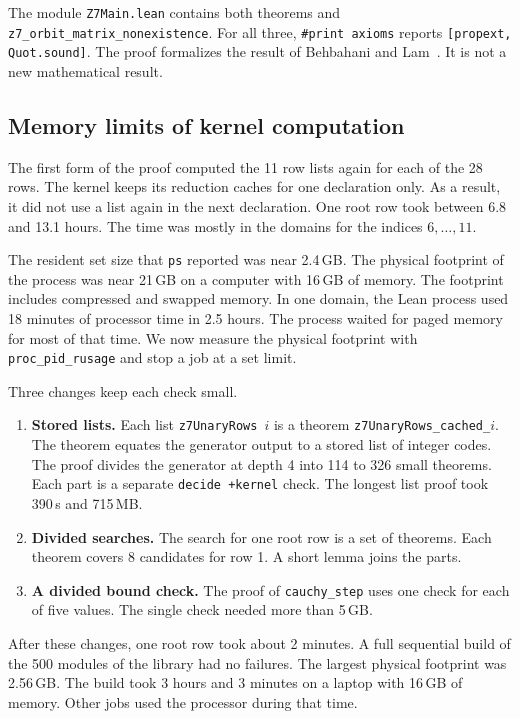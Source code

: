 \documentclass[pdflatex,sn-mathphys-num]{sn-jnl}
\theoremstyle{thmstyleone}
\theoremstyle{thmstyletwo}
\theoremstyle{thmstylethree}
\numberwithin{equation}{section}
\begin{document}
The module \texttt{Z7Main.lean} contains both theorems and \texttt{z7\_orbit\_matrix\_nonexistence}. For all three, \texttt{\#print axioms} reports \texttt{[propext, Quot.sound]}. The proof formalizes the result of Behbahani and Lam~\cite{behbahani2011strongly}. It is not a new mathematical result.

\subsection{Memory limits of kernel computation}
\label{sec:resources}

The first form of the proof computed the 11 row lists again for each of the 28 rows. The kernel keeps its reduction caches for one declaration only. As a result, it did not use a list again in the next declaration. One root row took between 6.8 and 13.1 hours. The time was mostly in the domains for the indices $6, \dots, 11$.

The resident set size that \texttt{ps} reported was near 2.4\,GB. The physical footprint of the process was near 21\,GB on a computer with 16\,GB of memory. The footprint includes compressed and swapped memory. In one domain, the Lean process used 18 minutes of processor time in 2.5 hours. The process waited for paged memory for most of that time. We now measure the physical footprint with \texttt{proc\_pid\_rusage} and stop a job at a set limit.

Three changes keep each check small.
\begin{enumerate}
 \item \textbf{Stored lists.} Each list \texttt{z7UnaryRows}~$i$ is a theorem \texttt{z7UnaryRows\_cached\_$i$}. The theorem equates the generator output to a stored list of integer codes. The proof divides the generator at depth 4 into 114 to 326 small theorems. Each part is a separate \texttt{decide +kernel} check. The longest list proof took 390\,s and 715\,MB.
 \item \textbf{Divided searches.} The search for one root row is a set of theorems. Each theorem covers 8 candidates for row 1. A short lemma joins the parts.
 \item \textbf{A divided bound check.} The proof of \texttt{cauchy\_step} uses one check for each of five values. The single check needed more than 5\,GB.
\end{enumerate}
After these changes, one root row took about 2 minutes.
A full sequential build of the 500 modules of the library had no failures. The largest physical footprint was 2.56\,GB. The build took 3 hours and 3 minutes on a laptop with 16\,GB of memory. Other jobs used the processor during that time.
\end{document}
